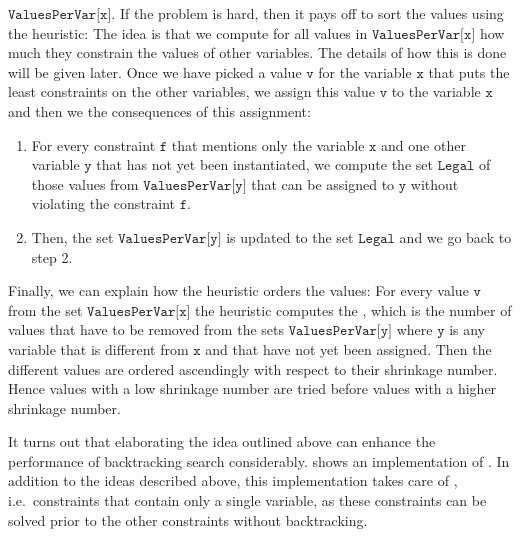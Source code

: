 \begin{enumerate}
      $\texttt{ValuesPerVar[x]}$.  If the problem is hard, then it pays off to sort the values using the
       heuristic:  The idea is that
      we compute for all values in  $\texttt{ValuesPerVar[x]}$ how much they constrain the values 
      of other variables.  The details of how this is done will be given later.  Once we have picked a value
      $\texttt{v}$ for the variable $\texttt{x}$ that puts the least constraints on the other variables, we
      assign this value $\texttt{v}$ to the variable $\texttt{x}$ and then we  the consequences of this assignment: 
      \begin{enumerate}
      \item For every constraint $\texttt{f}$ that mentions only the variable $\texttt{x}$ and one other variable
            $\texttt{y}$ that has not yet been instantiated, we compute the set $\texttt{Legal}$ of those values from 
            $\texttt{ValuesPerVar[y]}$ that can be assigned to $\texttt{y}$ without violating the constraint
            $\texttt{f}$.
            
      \item Then, the set $\texttt{ValuesPerVar[y]}$ is updated to the set $\texttt{Legal}$ and we go back to
            step 2.
      \end{enumerate}
      Finally, we can explain how the  heuristic orders the values:  For every value
      $\texttt{v}$ from the set $\texttt{ValuesPerVar[x]}$ the heuristic computes the ,
      which is the number of values that have to be removed from the sets $\texttt{ValuesPerVar[y]}$ where
      $\texttt{y}$ is any variable that is different from $\texttt{x}$ and that have not yet been assigned.
      Then the different values are ordered ascendingly with respect to their shrinkage number.  Hence values
      with a low shrinkage number are tried before values with a higher shrinkage number.
\end{enumerate}
It turns out that elaborating the idea outlined above can enhance the performance of backtracking search
considerably.   shows an implementation of 
.  In addition to the ideas described above, this implementation takes care of
, i.e.~constraints that contain only a single variable, as these constraints can be
solved prior to the other constraints without backtracking.


